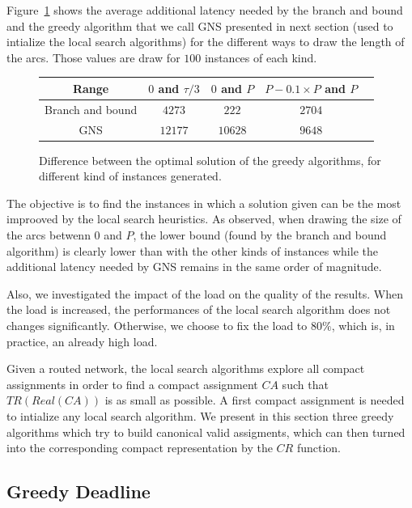 \documentclass[english]{article}
\begin{document}
Figure~\ref{tab:instances} shows the average additional latency needed by the branch and bound and the greedy algorithm that we call GNS presented in next section (used to intialize the local search algorithms) for the different ways to draw the length of the arcs. Those values are draw for $100$ instances of each kind.

\begin{center}
\begin{figure}
\centering
\begin{tabular}{ |c|c|c|c|c| }
\hline
    Range & $0$ and $\tau/3$ & $0$ and $P$& $P-0.1\times P$ and $P$\\
    \hline
    Branch and bound & $4273$ & $222$& $2704$ \\
 
    GNS & $12177$ & $10628$& $9648$\\
   
    \hline
  
 \end{tabular}
 \caption{Difference between the optimal solution of the greedy algorithms, for different kind of instances generated.}
 \label{tab:instances}
 \end{figure}
 \end{center}
 The objective is to find the instances in which a solution given can be the most improoved by the local search heuristics. As observed, when drawing the size of the arcs betwenn $0$ and $P$, the lower bound (found by the branch and bound algorithm) is clearly lower than with the other kinds of instances while the additional latency needed by GNS remains in the same order of magnitude.
 
 Also, we investigated the impact of the load on the quality of the results. When the load is increased, the performances of the local search algorithm does not changes significantly. Otherwise, we choose to fix the load to $80\%$, which is, in practice, an already high load.

 
Given a routed network, the local search algorithms explore all compact assignments in order to find a compact assignment $CA$ such that $TR(Real(CA))$ is as small as possible. A first compact assignment is needed to intialize any local search algorithm. We present in this section three greedy algorithms which try to build canonical valid assigments, which can then 
turned into the corresponding compact representation by the $CR$ function.

\subsection{Greedy Deadline}
\end{document}
